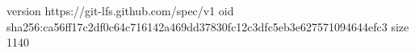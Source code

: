 version https://git-lfs.github.com/spec/v1
oid sha256:ca56ff17c2df0c64c716142a469dd37830fc12c3dfc5eb3e627571094644efc3
size 1140
